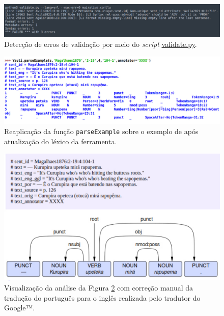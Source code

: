 \documentclass[portuguese]{textolivre}
\begin{document}
\begin{figure}[htbp]
  \centering
  \begin{minipage}{.75\textwidth}
    \includegraphics[width=\linewidth]{figures/validator.pdf}
    \caption{Detecção de erros de validação por meio do \textit{script} \href{https://github.com/UniversalDependencies/tools/blob/master/validate.py}{validate.py}.}
    \label{fig:validation}
  \end{minipage}
\end{figure}

\begin{figure}[htbp]
  \centering
  \begin{minipage}{.75\textwidth}
    \includegraphics[width=\linewidth]{figures/upeteka-magalhaes-idle.pdf}
    \caption{Reaplicação da função \texttt{parseExample} sobre o exemplo de \textcite[p. 126]{magalhaes1876} após atualização do léxico da ferramenta.}
    \label{fig:upeteka-magalhaes-idle}
  \end{minipage}
\end{figure}

\begin{figure}[htbp]
  \centering
  \begin{minipage}{.75\textwidth}
    \includegraphics[width=\linewidth]{figures/upeteka-magalhaes-tree.pdf}
    \caption{Visualização da análise da Figura \ref{fig:upeteka-magalhaes-idle} com correção manual da tradução do português para o inglês realizada pelo tradutor do Google™.}
    \label{fig:upeteka-tree}
  \end{minipage}
\end{figure}
\end{document}
